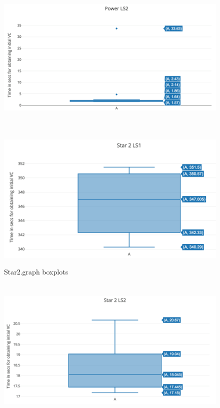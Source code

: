 \begin{figure}[H]
\centering
\includegraphics[height=7cm]{../graph/powerls2}
\end{figure}

\begin{figure}[H]
\centering
\caption{Star2.graph boxplots}
\includegraphics[height=7cm]{../graph/starls1}
\end{figure}

\begin{figure}[H]
\centering
\includegraphics[height=7cm]{../graph/starls2}
\end{figure}

\nocite{*}


